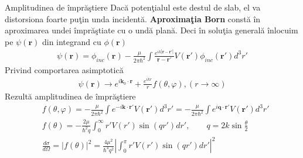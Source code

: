\begin{frame}[allowframebreaks]{Amplitudinea de \^{i}mpr\u{a}\c{s}tiere}
Dac\u{a} poten\c{t}ialul este destul de slab, el va distorsiona foarte pu\c{t}in unda incident\u{a}. {\bf Aproxima\c{t}ia Born} const\u{a} \^{i}n aproximarea undei \^{i}mpr\u{a}\c{s}tiate cu o und\u{a} plan\u{a}. Deci \^{i}n solu\c{t}ia general\u{a} \^{i}nlocuim pe $\psi({\bm r})$ din integrand cu $\phi({\bm r})$
\begin{align}
\psi({\bm r})=\phi_{inc}({\bm r})-\frac{\mu}{2\pi\hbar^2}\int\frac{e^{ik|{\bm r}-{\bm r'}|}}{{\bm r}-{\bm r'}}V({\bm r'})\phi_{inc}({\bm r'})d^3r'
\end{align}
Privind comportarea asimptotic\u{a}
\begin{align}
\psi({\bm r})\to e^{i{\bm k_0}\cdot{\bm r}}+\frac{e^{ikr}}{r}f(\theta,\varphi),(r\to\infty)
\end{align} 
Rezult\u{a} amplitudinea de \^{i}mpr\u{a}\c{s}tiere
\begin{align}
&f(\theta,\varphi)=-\frac{\mu}{2\pi\hbar^2}\int e^{-i{\bm k}\cdot{\bm r'}}V({\bm r'})d^3r'=-\frac{\mu}{2\pi\hbar^2}\int e^{i{\bm q}\cdot{\bm r'}}V({\bm r'})d^3r'\\
&f(\theta)=-\frac{2\mu}{\hbar^2q}\int_{0}^{\infty}r'V(r')\sin(qr')dr' ,\qquad q=2k\sin\frac{\theta}{2}\\
&\frac{d\sigma}{d\Omega}=|f(\theta)|^2=\frac{4\mu^2}{\hbar^4q^2}\left\lvert\int_{0}^{\pi}r'V(r')\sin(qr')dr'\right\rvert^2
\end{align}

\end{frame} 

